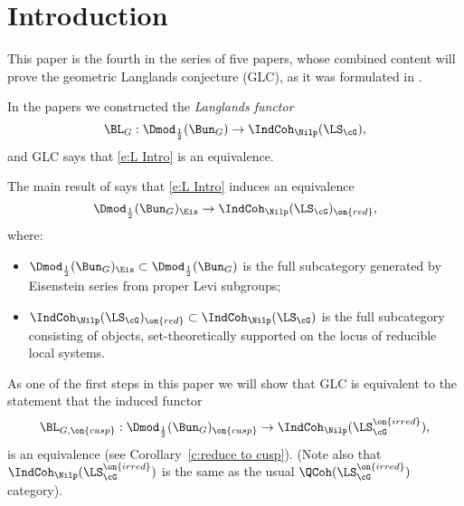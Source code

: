 \documentclass[9pt]{amsart}
\theoremstyle{remark}
\theoremstyle{definition}
\theoremstyle{remark}
\newcommand{\corref}[1]{Corollary~\ref{#1}}
\numberwithin{equation}{section}
\begin{document}

\tableofcontents

\section*{Introduction}

This paper is the fourth in the series of five papers, whose combined content will prove the geometric 
Langlands conjecture (GLC), as it was formulated in \cite[Conjecture 1.6.7]{GLC1}. 


\sssec{}

In the papers \cite{GLC1,GLC2,GLC3} we constructed the \emph{Langlands functor}
\begin{equation} \label{e:L Intro}
\BL_G:\Dmod_{\frac{1}{2}}(\Bun_G)\to \IndCoh_\Nilp(\LS_\cG),
\end{equation}
and GLC says that \eqref{e:L Intro} is an equivalence.

\sssec{}

The main result of \cite{GLC3} says that \eqref{e:L Intro} induces an equivalence
$$\Dmod_{\frac{1}{2}}(\Bun_G)_{\Eis}\to \IndCoh_\Nilp(\LS_\cG)_{\on{red}},$$
where:

\begin{itemize}

\item $\Dmod_{\frac{1}{2}}(\Bun_G)_{\Eis}\subset \Dmod_{\frac{1}{2}}(\Bun_G)$ is the
full subcategory generated by Eisenstein series from proper Levi subgroups;

\smallskip

\item $\IndCoh_\Nilp(\LS_\cG)_{\on{red}}\subset \IndCoh_\Nilp(\LS_\cG)$ is the
full subcategory consisting of objects, set-theoretically supported on the locus
of reducible local systems.

\end{itemize} 

\sssec{}

As one of the first steps in this paper we will show that GLC is equivalent to the statement that the 
induced functor
\begin{equation} \label{e:L cusp Intro}
\BL_{G,\on{cusp}}:\Dmod_{\frac{1}{2}}(\Bun_G)_{\on{cusp}}\to \IndCoh_\Nilp(\LS^{\on{irred}}_\cG),
\end{equation}
is an equivalence (see \corref{c:reduce to cusp}). (Note also that $\IndCoh_\Nilp(\LS^{\on{irred}}_\cG)$ is the same as the usual 
$\QCoh(\LS^{\on{irred}}_\cG)$ category). 
\end{document}
